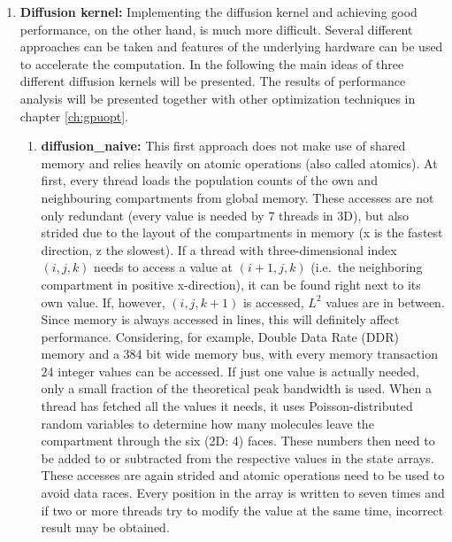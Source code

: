 \begin{enumerate}
\item \textbf{Diffusion kernel:} Implementing the diffusion kernel and achieving good performance, on the other hand, is much more difficult. Several different approaches can be taken and features of the underlying hardware can be used to accelerate the computation. In the following the main ideas of three different diffusion kernels will be presented. The results of performance analysis will be presented together with other optimization techniques in chapter \ref{ch:gpuopt}. 
\begin{enumerate}
\item \textbf{diffusion\_naive:} This first approach does not make use of shared memory and relies heavily on atomic operations (also called atomics). At first, every thread loads the population counts of the own and neighbouring compartments from global memory. These accesses are not only redundant (every value is needed by 7 threads in 3D), but also strided due to the layout of the compartments in memory (x is the fastest direction, z the slowest). If a thread with three-dimensional index $(i,j,k)$ needs to access a value at $(i+1,j,k)$ (i.e.\ the neighboring compartment in positive x-direction), it can be found right next to its own value. If, however, $(i,j,k+1)$ is accessed, $L^2$ values are in between. Since memory is always accessed in lines, this will definitely affect performance. Considering, for example, Double Data Rate (DDR) memory and a 384 bit wide memory bus, with every memory transaction 24 integer values can be accessed. If just one value is actually needed, only a small fraction of the theoretical peak bandwidth is used. 
When a thread has fetched all the values it needs, it uses Poisson-distributed random variables to determine how many molecules leave the compartment through the six (2D: 4) faces. These numbers then need to be added to or subtracted from the respective values in the state arrays. These accesses are again strided and atomic operations need to be used to avoid data races. Every position in the array is written to seven times and if two or more threads try to modify the value at the same time, incorrect result may be obtained. 


\end{enumerate}
\end{enumerate}
